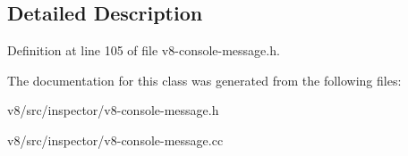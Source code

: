 \subsection{Detailed Description}


Definition at line 105 of file v8-\/console-\/message.\+h.



The documentation for this class was generated from the following files\+:\begin{DoxyCompactItemize}
\item 
v8/src/inspector/v8-\/console-\/message.\+h\item 
v8/src/inspector/v8-\/console-\/message.\+cc\end{DoxyCompactItemize}
